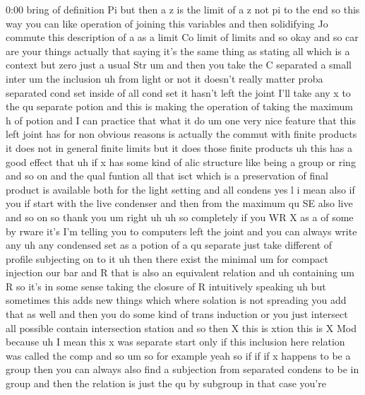 \begin{unfinished}{0:00}
bring  of  definition  Pi  but  then  a  z  is
the  limit  of  a  z  not  pi  to  the  end  so
this  way  you  can  like  operation  of
joining  this  variables  and  then
solidifying
Jo  commute  this  description  of  a  as  a
limit  Co  limit  of  limits  and
so
okay  and  so  car  are  your  things  actually
that
saying  it's  the  same  thing  as  stating
all  which  is  a  context  but  zero  just  a
usual  Str
um  and  then  you  take  the  C
separated  a  small  inter
um  the
inclusion  uh
from  light  or  not  it  doesn't  really
matter  proba  separated  cond  set  inside
of  all  cond
set  it  hasn't  left  the
joint  I'll  take  any  x  to  the  qu  separate
potion  and  this  is  making  the  operation
of  taking  the  maximum  h  of
potion  and  I  can  practice  that  what  it
do
um  one  very  nice  feature  that  this  left
joint  has  for  non  obvious  reasons  is
actually  the  commut  with  finite  products
it  does  not  in  general  finite  limits  but
it  does  those  finite  products  uh  this
has  a  good  effect  that  uh  if  x  has  some
kind  of  alic  structure  like  being  a
group  or  ring  and  so  on  and  the  qual
funtion  all  that
isct
which
is  a  preservation  of  final  product  is
available  both  for  the  light  setting  and
all  condens  yes
l  i  mean  also  if
you  if  start  with  the  live  condenser  and
then  from  the  maximum  qu  SE  also  live
and  so  on  so  thank
you
um  right  uh
uh  so
completely  if  you  WR  X  as  a  of  some  by
rware  it's  I'm  telling  you  to  computers
left  the  joint  and  you  can  always  write
any  uh  any  condensed  set  as  a  potion  of
a  qu  separate  just  take  different  of
profile  subjecting  on  to
it  uh  then  there  exist  the
minimal  um  for
compact
injection  our  bar  and  R  that  is  also  an
equivalent
relation
and  uh
containing  um  R  so  it's  in  some  sense
taking  the  closure  of  R  intuitively
speaking  uh  but  sometimes  this  adds  new
things  which  where  solation  is  not
spreading  you  add  that  as  well  and  then
you  do  some  kind  of  trans  induction  or
you  just  intersect  all
possible  contain  intersection
station  and  so
then  X  this  is
xtion  this  is  X
Mod  because  uh  I  mean  this  x  was
separate  start  only  if  this  inclusion
here  relation  was  called  the
comp
and
so  um  so  for
example  yeah  so  if  if  if  x  happens  to  be
a  group  then  you  can  always  also  find  a
subjection  from  separated  condens  to  be
in  group  and  then  the  relation  is  just
the  qu  by  subgroup  in  that  case  you're

\end{unfinished}
